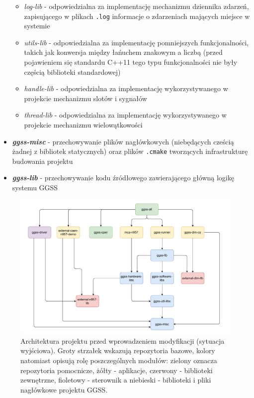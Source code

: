 \begin{itemize}
    \begin{itemize}
        \item \emph{log-lib} - odpowiedzialna za implementację mechanizmu dziennika zdarzeń, zapisującego w plikach \lstinline{.log} informacje o zdarzeniach mających miejsce w systemie
        \item \emph{utils-lib} - odpowiedzialna za implementację pomniejszych funkcjonalności, takich jak konwersja między łańuchem znakowym a liczbą (przed pojawieniem się standardu C++11 tego typu funkcjonalności nie były częścią biblioteki standardowej)
        \item \emph{handle-lib} - odpowiedzialna za implementację wykorzystywanego w projekcie mechanizmu slotów i sygnałów
        \item \emph{thread-lib} - odpowiedzialna za implementację wykorzystywanego w projekcie mechanizmu wielowątkowości
    \end{itemize}
    \item \textbf{\emph{ggss-misc}} - przechowywanie plików nagłówkowych (niebędących cześcią żadnej z bibliotek statycznych) oraz plików \lstinline{.cmake} tworzących infrastrukturę budowania projektu
    \item \textbf{\emph{ggss-lib}} - przechowywanie kodu źródłowego zawierającego główną logikę systemu GGSS
\end{itemize}

\begin{landscape}

\begin{figure}
\centering
\includegraphics[width=1.35\textwidth]{components/infra_images/old_structure.pdf}
\caption{Architektura projektu przed wprowadzeniem modyfikacji (sytuacja wyjściowa). Groty strzałek wskazują repozytoria bazowe, kolory natomiast opisują rolę poszczególnych modułów: zielony oznacza repozytoria pomocnicze, żółty - aplikacje, czerwony - biblioteki zewnętrzne, fioletowy - sterownik a niebieski - biblioteki i pliki nagłówkowe projektu GGSS.}
\label{fig:old_structure}
\end{figure}

\end{landscape}


